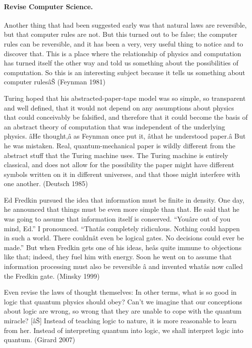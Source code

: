 \documentclass[12pt]{article}
\begin{document}
\paragraph*{Revise Computer Science.}

Another thing that had been suggested early was that natural laws are
reversible, but that computer rules are not. But this turned out to be
false; the computer rules can be reversible, and it has been a very,
very useful thing to notice and to discover that. This is a place
where the relationship of physics and computation has turned itself
the other way and told us something about the possibilities of
computation. So this is an interesting subject because it tells us
something about computer rulesâŠ  (Feynman 1981)

Turing hoped that his abstracted-paper-tape model was so simple, so
transparent and well defined, that it would not depend on any
assumptions about physics that could conceivably be falsified, and
therefore that it could become the basis of an abstract theory of
computation that was independent of the underlying physics. âHe
thought,â as Feynman once put it, âthat he understood paper.â But he
was mistaken. Real, quantum-mechanical paper is wildly different from
the abstract stuff that the Turing machine uses. The Turing machine is
entirely classical, and does not allow for the possibility the paper
might have different symbols written on it in different universes, and
that those might interfere with one another.  (Deutsch 1985)

Ed Fredkin pursued the idea that information must be finite in
density. One day, he announced that things must be even more simple
than that. He said that he was going to assume that information itself
is conserved. ``Youâre out of you mind, Ed.'' I pronounced. ``Thatâs
completely ridiculous. Nothing could happen in such a world. There
couldnât even be logical gates. No decisions could ever be made.'' But
when Fredkin gets one of his ideas, heâs quite immune to objections
like that; indeed, they fuel him with energy. Soon he went on to
assume that information processing must also be reversible â and
invented whatâs now called the Fredkin gate. (Minsky 1999)

Even revise the laws of thought themselves: In other terms, what is so
good in logic that quantum physics should obey? Can't we imagine that
our conceptions about logic are wrong, so wrong that they are unable
to cope with the quantum miracle? [âŠ] Instead of teaching logic to
nature, it is more reasonable to learn from her. Instead of
interpreting quantum into logic, we shall interpret logic into
quantum. (Girard 2007)
\end{document}
